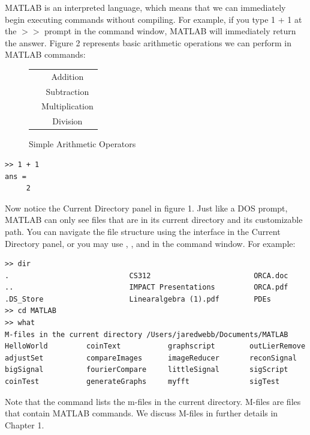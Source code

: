 MATLAB is an interpreted language, which means that we can immediately begin executing commands without compiling.  For example, if you type 1 + 1 at the $>>$ prompt in the command window, MATLAB will immediately return the answer. Figure 2 represents basic arithmetic operations we can perform in MATLAB commands:

\begin{figure}[h!]
\begin{center}
	\begin{tabular}{|c|c|}
	\hline
	\li{+} & Addition \\
	\li{-} & Subtraction \\
	\li{*} & Multiplication \\
	\li{/} & Division \\
	\hline
	\end{tabular}
	\caption{Simple Arithmetic Operators}
\end{center}
\end{figure}

\begin{lstlisting}[style=matlab]
>> 1 + 1
ans =
     2
\end{lstlisting}


Now notice the Current Directory panel in figure 1.  Just like a DOS prompt, MATLAB can only see files that are in its current directory and its customizable path.  You can navigate the file structure using the interface in the Current Directory panel, or you may use , , and  in the command window.  For example:

\begin{lstlisting}[style=matlab]
>> dir
.                            CS312                        ORCA.doc                                    
..                           IMPACT Presentations         ORCA.pdf                       
.DS_Store                    Linearalgebra (1).pdf        PDEs                           
>> cd MATLAB
>> what
M-files in the current directory /Users/jaredwebb/Documents/MATLAB
HelloWorld         coinText           graphscript        outLierRemove      
adjustSet          compareImages      imageReducer       reconSignal        
bigSignal          fourierCompare     littleSignal       sigScript          
coinTest           generateGraphs     myfft              sigTest            
\end{lstlisting}

Note that the  command lists the m-files in the current directory. M-files are files that contain MATLAB commands.  We discuss M-files in further details in Chapter 1.

